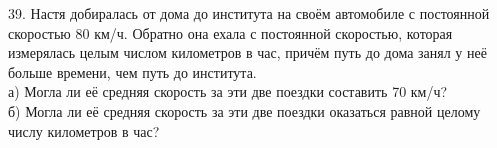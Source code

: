 39. Настя добиралась от дома до института на своём автомобиле с постоянной скоростью 80 км/ч. Обратно она ехала с постоянной скоростью, которая измерялась целым числом километров в час, причём путь до дома занял у неё больше времени, чем путь до института.\\
а) Могла ли её средняя скорость за эти две поездки составить 70 км/ч?\\
б) Могла ли её средняя скорость за эти две поездки оказаться равной целому числу километров в час?\\
